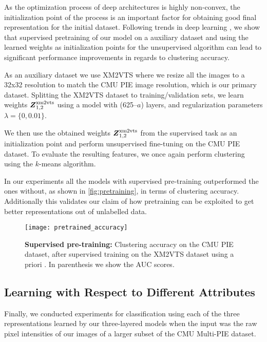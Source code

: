 \documentclass[10pt,journal,compsoc]{IEEEtran}
\begin{document}
As the optimization process of deep architectures is highly non-convex, the initialization point of the process is an important factor for obtaining good final representation for the initial dataset. Following trends in deep learning \cite{bengio2007greedy}, we show that supervised pretraining of our model on a auxiliary dataset and using the learned weights as initialization points for the unsupervised \deepseminmf algorithm can lead to significant performance improvements in regards to clustering accuracy.

As an auxiliary dataset we use XM2VTS where we resize all the images to a 32x32 resolution to match the CMU PIE image resolution, which is our primary dataset.
Splitting the XM2VTS dataset to training/validation sets, we learn weights $\boldsymbol{Z}^{\text{xm2vts}}_{1,2}$ using a \dwsf{} model with (625--$a$) layers, and regularization parameters $\lambda = \{0, 0.01\}$.

We then use the obtained weights $\boldsymbol{Z}^{\text{xm2vts}}_{1,2}$ from the supervised task as an initialization point and perform unsupervised fine-tuning on the CMU PIE dataset. To evaluate the resulting features, we once again perform clustering using the $k$-means algorithm.

In our experiments all the models  with supervised pre-training outperformed the ones without, as shown in \autoref{fig:pretraining}, in terms of clustering accuracy. Additionally this validates our claim of how pretraining can be exploited to get better representations out of unlabelled data.
\begin{figure}[hptb]
  \centering
  \texttt{[image: pretrained\_accuracy]}
  \vspace{-2em}
  \caption{\textbf{Supervised pre-training:} Clustering accuracy on the CMU PIE dataset, after supervised training on the XM2VTS dataset using a priori \deepseminmf. In parenthesis we show the AUC scores.} \label{fig:pretraining}
\end{figure}

\subsection{Learning with Respect to Different Attributes}\label{sub:multiple_attributes}
Finally, we conducted experiments for classification using each of the three representations learned by our three-layered \dwsf models when the input was the raw pixel intensities of our images of a larger subset of the CMU Multi-PIE dataset.
\end{document}
